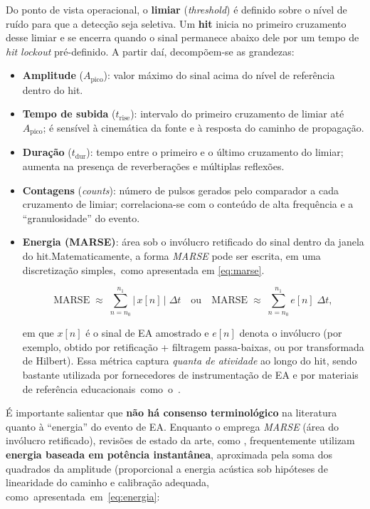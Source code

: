 Do ponto de vista operacional, o \textbf{limiar} (\textit{threshold}) é definido sobre o nível de ruído para que a detecção seja seletiva. Um \textbf{hit} inicia no primeiro cruzamento desse limiar e se encerra quando o sinal permanece abaixo dele por um tempo de \textit{hit lockout} pré-definido. A partir daí, decompõem-se as grandezas:
\begin{itemize}
    \item \textbf{Amplitude} ($A_\text{pico}$): valor máximo do sinal acima do nível de referência dentro do hit.
    \item \textbf{Tempo de subida} ($t_\text{rise}$): intervalo do primeiro cruzamento de limiar até $A_\text{pico}$; é sensível à cinemática da fonte e à resposta do caminho de propagação.
    \item \textbf{Duração} ($t_\text{dur}$): tempo entre o primeiro e o último cruzamento do limiar; aumenta na presença de reverberações e múltiplas reflexões.
    \item \textbf{Contagens} (\textit{counts}): número de pulsos gerados pelo comparador a cada cruzamento de limiar; correlaciona-se com o conteúdo de alta frequência e a “granulosidade” do evento.
    \item \textbf{Energia (MARSE)}: área sob o invólucro retificado do sinal dentro da janela do hit.Matematicamente, a forma \textit{MARSE} pode ser escrita, em uma discretização simples,~como apresentada em \ref{eq:marse}. 
    
    \begin{equation}
    	\label{eq:marse}
    	\text{MARSE} \;\approx\; \sum_{n=n_0}^{n_1} \big|\,x[n]\,\big| \;\Delta t
    	\quad\text{ou}\quad
    	\text{MARSE} \;\approx\; \sum_{n=n_0}^{n_1} e[n] \;\Delta t,
    \end{equation}
    
    em que $x[n]$ é o sinal de EA amostrado e $e[n]$ denota o invólucro (por exemplo, obtido por retificação + filtragem passa-baixas, ou por transformada de Hilbert). Essa métrica captura \textit{quanta de atividade} ao longo do hit, sendo bastante utilizada por fornecedores de instrumentação de EA e por materiais de referência \mbox{educacionais como o .}
\end{itemize}

É importante salientar que \textbf{não há consenso terminológico} na literatura quanto à ``energia'' do evento de EA. Enquanto o  emprega \textit{MARSE} (área do invólucro retificado), revisões de estado da arte, como , frequentemente utilizam \textbf{energia baseada em potência instantânea}, aproximada pela soma dos quadrados da amplitude (proporcional a energia acústica sob hipóteses de linearidade do caminho e calibração adequada, \mbox{como apresentada em \ref{eq:energia}:}

